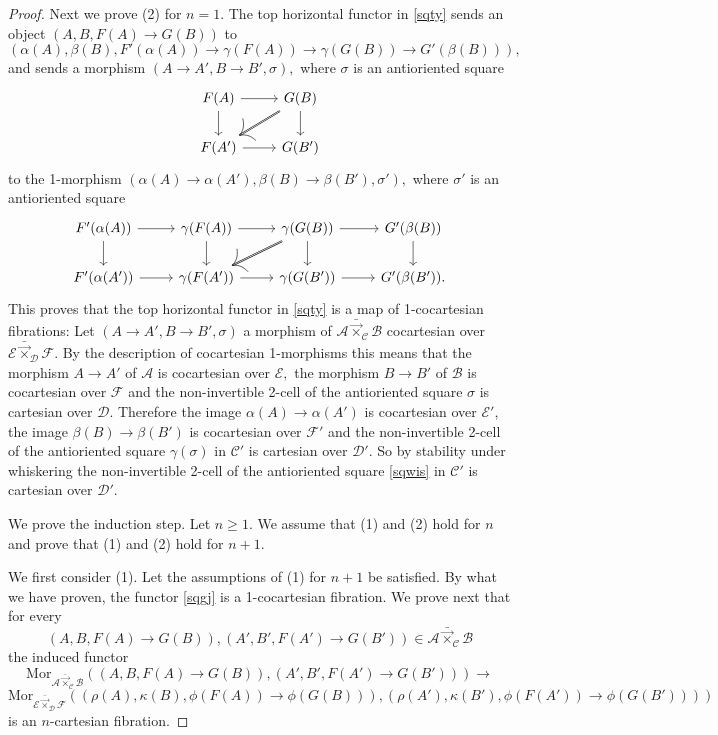 \documentclass[10pt,oneside]{article}
\numberwithin{equation}{section} %
\numberwithin{figure}{section} %
\theoremstyle{plain}
\theoremstyle{definition}
\newcommand{\mA}{{\mathcal A}}
\newcommand{\mB}{{\mathcal B}}
\newcommand{\mC}{{\mathcal C}}
\newcommand{\mD}{{\mathcal D}}
\newcommand{\mE}{{\mathcal E}}
\newcommand{\mF}{{\mathcal F}}
\newcommand{\Mor}{{\mathrm{Mor}}}
\begin{document}
\begin{proof}
Next we prove (2) for $n=1.$
The top horizontal functor in \ref{sqty} 
sends an object $(A,B,F(A) \to G(B))$ to $$(\alpha(A),\beta(B),F'(\alpha(A)) \to \gamma(F(A)) \to \gamma(G(B)) \to G'(\beta(B))),$$
and sends a morphism 
$ (A \to A', B \to B', \sigma),$ where $\sigma$ is an antioriented square
\begin{equation}\label{orsquo}
\begin{tikzcd}
F(A) \ar{r}{} \ar{d}[swap]{} & G(B) \ar[double]{dl}{} \ar{d}{} \\
F(A')  \ar{r}[swap]{} & G(B')
\end{tikzcd}
\end{equation}
to the 1-morphism $ (\alpha(A) \to \alpha(A'), \beta(B) \to \beta(B'), \sigma'),$ where $\sigma'$ is an antioriented square
\begin{equation}\label{sqwis}
\begin{tikzcd}
F'(\alpha(A)) \ar{r}{} \ar{d}[swap]{} & \gamma(F(A)) \ar{r}{} \ar{d}[swap]{} & \gamma(G(B)) \ar[double]{dl}{} \ar{d}{} \ar{r}{} & G'(\beta(B)) \ar{d}{} \\
F'(\alpha(A')) \ar{r}[swap]{} & \gamma(F(A')) \ar{r}[swap]{} & \gamma(G(B')) \ar{r}[swap]{} & G'(\beta(B')).
\end{tikzcd}
\end{equation}
This proves that the top horizontal functor in \ref{sqty} 
is a map of 1-cocartesian fibrations:
Let
$ (A \to A', B \to B', \sigma)$ a morphism of $\mA {\bar{\vec{\times}}}_{\mC} \mB$
cocartesian over 
$\mE {\bar{\vec{\times}}}_{\mD} \mF.$ By the description of cocartesian 1-morphisms this means that the morphism $A \to A'$ of $\mA$
is cocartesian over $\mE,$ the morphism $B \to B'$ of $\mB$
is cocartesian over $\mF$ and the non-invertible 2-cell of the antioriented square $\sigma$ is cartesian over $\mD.$
Therefore the image $\alpha(A) \to \alpha(A')$ is cocartesian over $\mE'$, the image $\beta(B) \to \beta(B')$ is cocartesian over $\mF'$
and the non-invertible 2-cell of the antioriented square $\gamma(\sigma)$ in $\mC'$ is cartesian over $\mD'.$
So by stability under whiskering the non-invertible 2-cell of the antioriented square \ref{sqwis} in $\mC'$ is cartesian over $\mD'.$

We prove the induction step. Let $n \geq 1.$ We assume that (1) and (2) hold for $n$ and prove that (1) and (2) hold for $n+1.$

We first consider (1). Let the assumptions of (1) for $n+1$ be satisfied.
By what we have proven, the functor \ref{sqgj} is a 1-cocartesian fibration.
We prove next that for every $$ (A, B, F(A) \to G(B)), (A', B', F(A') \to G(B')) \in \mA {\bar{\vec{\times}}}_{\mC} \mB$$ 
the induced functor $$\Mor_{\mA {\bar{\vec{\times}}}_{\mC} \mB}((A, B, F(A) \to G(B)), (A', B', F(A') \to G(B'))) \to $$$$ \Mor_{\mE {\bar{\vec{\times}}}_\mD \mF}((\rho(A), \kappa(B), \phi(F(A)) \to \phi(G(B))), (\rho(A'), \kappa(B'), \phi(F(A')) \to \phi(G(B'))))$$
is an $n$-cartesian fibration.


\end{proof}
\end{document}
